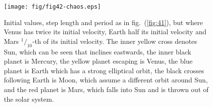 \documentclass[a4paper,11pt]{article}
\begin{document}
\begin{figure}[htb]
    \centering
    \texttt{[image: fig/fig42-chaos.eps]}
    \caption{Initial values, step length and period as in fig.~(\ref{fig:41}), but where Venus has twice its initial velocity, Earth half its initial velocity and Mars $^1\!/_{10}$-th of its initial velocity. The inner yellow cross denotes Sun, which can be seen that inclines eastwards, the inner black planet is Mercury, the yellow planet escaping is Venus, the blue planet is Earth which has a strong elliptical orbit, the black crosses following Earth is Moon, which assume a different orbit around Sun, and the red planet is Mars, which falls into Sun and is thrown out of the solar system.}
    \label{fig:42}
\end{figure}




\end{document}
